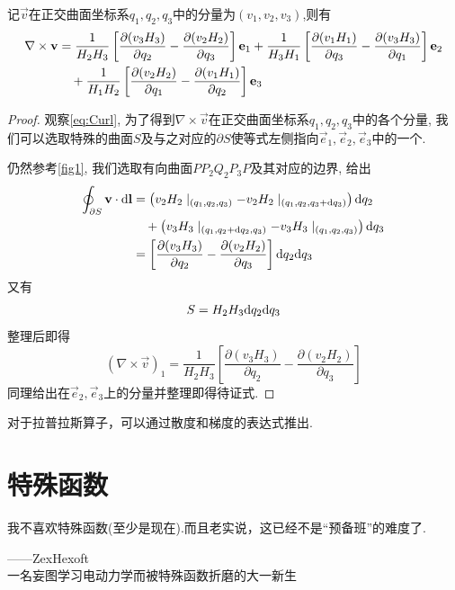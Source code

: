 \begin{theorem}
    记$\vec v$在正交曲面坐标系${q_1,q_2,q_3}$中的分量为$(v_1,v_2,v_3)$,则有
    \begin{align}
        \nabla \times \vec{v} &= \frac{1}{H_2H_3}\left[\frac{\partial (v_3H_3)}{\partial q_2}-\frac{\partial (v_2H_2)}{\partial q_3}\right]\vec e_1+\frac{1}{H_3H_1}\left[\frac{\partial (v_1H_1)}{\partial q_3}-\frac{\partial (v_3H_3)}{\partial q_1}\right]\vec e_2\notag\\
        &\quad + \frac{1}{H_1H_2}\left[\frac{\partial (v_2H_2)}{\partial q_1}-\frac{\partial (v_1H_1)}{\partial q_2}\right]\vec e_3
    \end{align}
\end{theorem}

\begin{proof}
    观察\cref{eq:Curl}, 为了得到$\nabla \times \vec{v}$在正交曲面坐标系${q_1,q_2,q_3}$中的各个分量, 我们可以选取特殊的曲面$S$及与之对应的$\partial S$使等式左侧指向$\vec e_1, \vec e_2, \vec e_3$中的一个.
    
    仍然参考\cref{fig1}, 我们选取有向曲面$PP_2Q_2P_3P$及其对应的边界, 给出
    \begin{align}
        \oint_{\partial S}\vec v \cdot \rmd \vec l &= \left(v_2H_2\mid_{(q_1,q_2,q_3)}-v_2H_2\mid_{(q_1,q_2,q_3+\rmd q_3)}\right)\rmd q_2\notag\\
        &\quad + \left(v_3H_3\mid_{(q_1,q_2+\rmd q_2,q_3)}-v_3H_3\mid_{(q_1,q_2,q_3)}\right)\rmd q_3\notag\\
        &=\left[\frac{\partial (v_3H_3)}{\partial q_2}-\frac{\partial (v_2H_2)}{\partial q_3}\right]\rmd q_2 \rmd q_3 
    \end{align}
    又有
    \begin{equation}
        S = H_2H_3\rmd q_2 \rmd q_3 
    \end{equation}
    整理后即得
    \begin{equation}
        \left(\nabla \times \vec v \right)_1=\frac{1}{H_2H_3}\left[\frac{\partial (v_3H_3)}{\partial q_2}-\frac{\partial (v_2H_2)}{\partial q_3}\right]
    \end{equation}
    同理给出在$\vec e_2,\vec e_3$上的分量并整理即得待证式.
\end{proof}

对于拉普拉斯算子，可以通过散度和梯度的表达式推出.

\section{特殊函数}
\epigraph{我不喜欢特殊函数(至少是现在).而且老实说，这已经不是“预备班”的难度了.}{——ZexHexoft\\一名妄图学习电动力学而被特殊函数折磨的大一新生}

